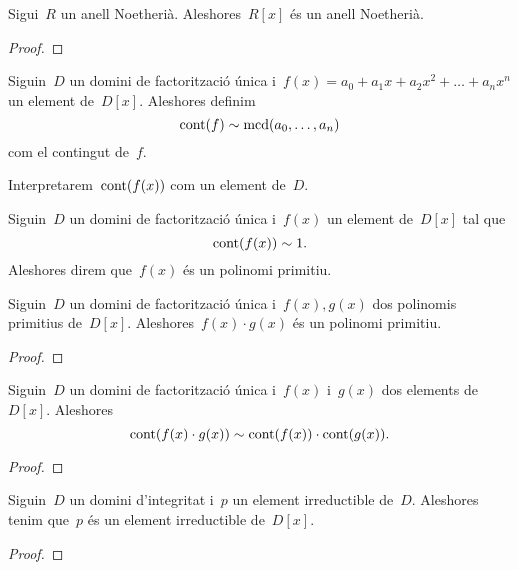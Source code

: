 \documentclass[../../main.tex]{subfiles}
\begin{document}
    \begin{theorem}
        Sigui~\(R\) un anell Noetherià.
        Aleshores~\(R[x]\) és un anell Noetherià.
        \begin{proof}
        \end{proof}
    \end{theorem}
    \begin{definition}
        \label{def:contingut d'un polinomi}
        Siguin~\(D\) un domini de factorització única i~\(f(x)=a_{0}+a_{1}x+a_{2}x^{2}+\dots+a_{n}x^{n}\) un element de~\(D[x]\).
        Aleshores definim
        \[
            \operatorname{cont}(f)\sim\operatorname{mcd}(a_{0},\dots,a_{n})
        \]
        com el contingut de~\(f\).

        Interpretarem~\(\operatorname{cont}(f(x))\) com un element de~\(D\).
    \end{definition}
    \begin{definition}
        Siguin~\(D\) un domini de factorització única i~\(f(x)\) un element de~\(D[x]\) tal que
        \[
            \operatorname{cont}(f(x))\sim1.
        \]
        Aleshores direm que~\(f(x)\) és un polinomi primitiu.
    \end{definition}
    \begin{lemma}
        \label{lema:lema de Gauss}
        Siguin~\(D\) un domini de factorització única i~\(f(x),g(x)\) dos polinomis primitius de~\(D[x]\).
        Aleshores~\(f(x)\cdot g(x)\) és un polinomi primitiu.
        \begin{proof}
        \end{proof}
    \end{lemma}
    \begin{corollary}
        Siguin~\(D\) un domini de factorització única i~\(f(x)\) i~\(g(x)\) dos elements de~\(D[x]\).
        Aleshores
        \[
            \operatorname{cont}(f(x)\cdot g(x))\sim\operatorname{cont}(f(x))\cdot\operatorname{cont}(g(x)).
        \]
        \begin{proof}
        \end{proof}
    \end{corollary}
    \begin{lemma}
        Siguin~\(D\) un domini d'integritat i~\(p\) un element irreductible de~\(D\).
        Aleshores tenim que~\(p\) és un element irreductible de~\(D[x]\).
        \begin{proof}
        \end{proof}
    \end{lemma}
\end{document}
